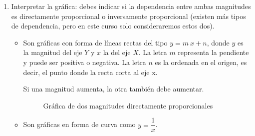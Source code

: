 \begin{enumerate}[label=\numberballmDarkTeal]
\begin{itemize}
        \end{itemize}
        \item Interpretar la gráfica: debes indicar si la dependencia entre ambas magnitudes es directamente proporcional o inversamente proporcional (existen más tipos de dependencia, pero en este curso solo consideraremos estos dos).
        \begin{itemize}
            \item {}
            Son gráficas con forma de líneas rectas del tipo \( y = m\ x + n \),
            donde \( y \) es la magnitud del eje \( Y \) y \( x \) la del eje \( X \).
            La letra \( m \) representa la pendiente y puede ser positiva o negativa.
            La letra \( n \) es la ordenada en el origen, es decir, el punto donde la recta corta al eje x.

            \begin{remark}
                Si una magnitud aumenta, la otra también debe aumentar.
            \end{remark}
            \begin{figure}[H]
                \centering
                \caption{Gráfica de dos magnitudes directamente proporcionales}
            \end{figure}
            \item {}
            Son gráficas en forma de curva como \( y = \dfrac{1}{x} \).


\end{itemize}
\end{enumerate}
